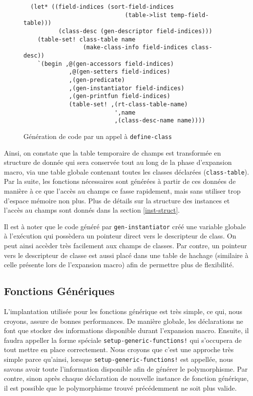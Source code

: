       \begin{figure}[h!]
        \begin{lstlisting}
  (let* ((field-indices (sort-field-indices
                             (table->list temp-field-table)))
          (class-desc (gen-descriptor field-indices)))
    (table-set! class-table name 
                 (make-class-info field-indices class-desc))
    `(begin ,@(gen-accessors field-indices)
             ,@(gen-setters field-indices)
             ,(gen-predicate)
             ,(gen-instantiator field-indices)
             ,(gen-printfun field-indices)
             (table-set! ,(rt-class-table-name)
                          ',name
                          ,(class-desc-name name))))
        \end{lstlisting}
        \caption{Génération de code par un appel à \texttt{define-class}}
        \label{class-code-gen}
      \end{figure}

      Ainsi, on constate que la table temporaire de champs est
      transformée en structure de donnée qui sera conservée tout au
      long de la phase d'expansion macro, via une table globale
      contenant toutes les classes déclarées
      (\texttt{class-table}). Par la suite, les fonctions nécessaires
      sont générées à partir de ces données de manière à ce que
      l'accès au champs ce fasse rapidement, mais sans utiliser trop
      d'espace mémoire non plus. Plus de détails sur la structure des
      instances et l'accès au champs sont donnés dans la section
      \ref{inst-struct}.

      Il est à noter que le code généré par \texttt{gen-instantiator}
      créé une variable globale à l'exécution qui possèdera un
      pointeur direct vers le descripteur de class. On peut ainsi
      accèder très facilement aux champs de classes. Par contre, un
      pointeur vers le descripteur de classe est aussi placé dans une
      table de hachage (similaire à celle présente lors de l'expansion
      macro) afin de permettre plus de flexibilité.

  \subsection{Fonctions Génériques}
    L'implantation utilisée pour les fonctions générique est très
    simple, ce qui, nous croyons, assure de bonnes performances. De
    manière globale, les déclarations ne font que stocker des
    informations disponible durant l'expansion macro. Ensuite, il
    faudra appeller la forme spéciale
    \texttt{setup-generic-functions!} qui s'occupera de tout mettre en
    place correctement. Nous croyons que c'est une approche très
    simple parce qu'ainsi, lorsque \texttt{setup-generic-functions!}
    est appellée, nous savons avoir toute l'information disponible
    afin de générer le polymorphisme. Par contre, sinon après chaque
    déclaration de nouvelle instance de fonction générique, il est
    possible que le polymorphisme trouvé précédemment ne soit plus
    valide.

